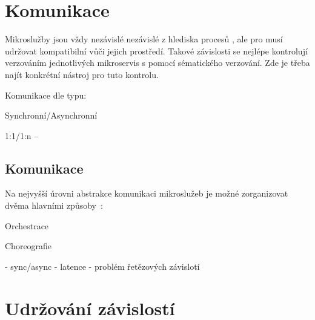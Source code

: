 \section{Komunikace }\label{sec:msa-communication}

Mikroslužby jsou vždy nezávislé nezávislé z hlediska procesů , ale pro  musí udržovat kompatibilní  vůči jejich prostředí.
Takové závislosti se nejlépe kontrolují verzováním jednotlivých mikroservis s pomocí sématického verzování.
Zde je třeba najít konkrétní nástroj pro tuto kontrolu.

Komunikace dle typu:

\begin{dl}
   \item [Synchronní/Asynchronní]
   \item [1:1/1:n] –
\end{dl}





\subsection{Komunikace}

Na nejvyšší úrovni abstrakce komunikaci mikroslužeb je možné zorganizovat dvěma hlavními způsoby~\cite{choreovsorch}:

\begin{ul}
   \item Orchestrace
   \item Choreografie
\end{ul}




- sync/async
- latence
- problém řetězových závislotí



\section{Udržování závislostí}\label{sec:msa-dependencies}
